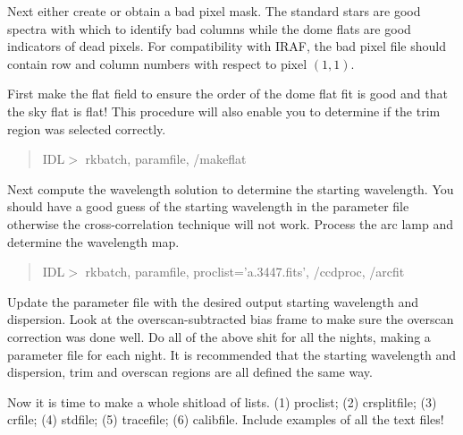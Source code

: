 \documentclass[12pt,preprint]{aastex}
\begin{document}
Next either create or obtain a bad pixel mask.  The standard stars are
good spectra with which to identify bad columns while the dome flats
are good indicators of dead pixels.  For compatibility with IRAF, the
bad pixel file should contain row and column numbers with respect to
pixel $(1,1)$.  

First make the flat field to ensure the order of the dome flat fit is
good and that the sky flat is flat!  This procedure will also enable
you to determine if the trim region was selected correctly.

\begin{quote}
IDL$>$ rkbatch, paramfile, /makeflat
\end{quote}

\noindent Next compute the wavelength solution to determine the
starting wavelength.  You should have a good guess of the starting
wavelength in the parameter file otherwise the cross-correlation
technique will not work.  Process the arc lamp and determine the
wavelength map.

\begin{quote}
IDL$>$ rkbatch, paramfile, proclist='a.3447.fits', /ccdproc, /arcfit
\end{quote}

\noindent Update the parameter file with the desired output starting
wavelength and dispersion.  Look at the overscan-subtracted bias frame
to make sure the overscan correction was done well.  Do all of the
above shit for all the nights, making a parameter file for each
night.  It is recommended that the starting wavelength and dispersion,
trim and overscan regions are all defined the same way.

Now it is time to make a whole shitload of lists.  (1) proclist; (2)
crsplitfile; (3) crfile; (4) stdfile; (5) tracefile; (6) calibfile.
Include examples of all the text files!
\end{document}
